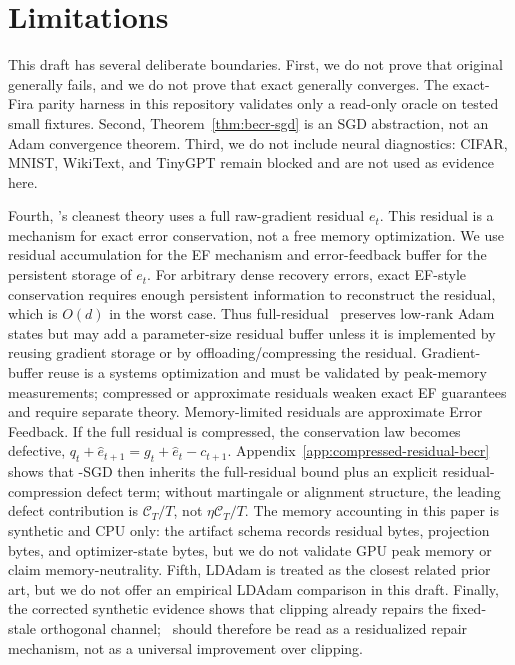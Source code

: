 \section{Limitations}

This draft has several deliberate boundaries. First, we do not prove that
original \Fira generally fails, and we do not prove that exact \Fira generally
converges. The exact-Fira parity harness in this repository validates only a
read-only oracle on tested small fixtures. Second, Theorem~\ref{thm:becr-sgd}
is an SGD abstraction, not an Adam convergence theorem. Third, we do not
include neural diagnostics: CIFAR, MNIST, WikiText, and TinyGPT remain blocked
and are not used as evidence here.

Fourth, \BECR's cleanest theory uses a full raw-gradient residual $e_t$. This
residual is a mechanism for exact error conservation, not a free memory
optimization. We use residual accumulation for the EF mechanism and
error-feedback buffer for the persistent storage of $e_t$. For arbitrary dense
recovery errors, exact EF-style conservation requires enough persistent
information to reconstruct the residual, which is $O(d)$ in the worst case.
Thus full-residual \BECR\ preserves low-rank Adam states but may add a
parameter-size residual buffer unless it is implemented by reusing gradient
storage or by offloading/compressing the residual. Gradient-buffer reuse is a
systems optimization and must be validated by peak-memory measurements;
compressed or approximate residuals weaken exact EF guarantees and require
separate theory. Memory-limited residuals are approximate Error Feedback. If
the full residual is compressed, the conservation law becomes defective,
$q_t+\hat e_{t+1}=g_t+\hat e_t-c_{t+1}$. Appendix~\ref{app:compressed-residual-becr}
shows that \BECR-SGD then inherits the full-residual bound plus an explicit
residual-compression defect term; without martingale or alignment structure,
the leading defect contribution is $\mathcal C_T/T$, not
$\eta\mathcal C_T/T$. The memory accounting in this paper is synthetic and CPU only:
the artifact schema records residual bytes, projection bytes, and
optimizer-state bytes, but we do not validate GPU peak memory or claim
memory-neutrality. Fifth, LDAdam is treated as the closest related prior art,
but we do not offer an empirical LDAdam comparison in this draft. Finally, the
corrected synthetic evidence shows that clipping already repairs the
fixed-stale orthogonal channel; \BECR\ should therefore be read as a
residualized repair mechanism, not as a universal improvement over clipping.

